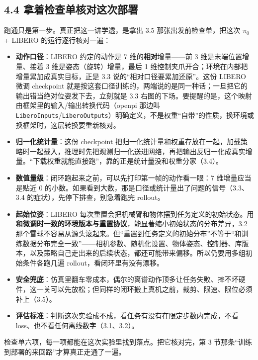 \documentclass[
  chinese,
]{ctexart}
\providecommand{\tightlist}{%
  \setlength{\itemsep}{0pt}\setlength{\parskip}{0pt}}
\begin{document}
\subsection{4.4
拿着检查单核对这次部署}\label{ux62ffux7740ux68c0ux67e5ux5355ux6838ux5bf9ux8fd9ux6b21ux90e8ux7f72}

跑通只是第一步。真正把这一讲学透，是拿出 3.5 那张出发前检查单，把这次
\(\pi_0\) + LIBERO 的运行逐行核对一遍：

\begin{itemize}
\tightlist
\item
  \textbf{动作口径}：LIBERO 约定的动作是 7 维的\textbf{相对}增量------前
  3 维是末端位置增量、接着 3 维是姿态（旋转）增量，最后 1
  维控制夹爪开合；环境在内部把增量累加成真实目标，正是 3.3
  说的``相对口径要累加还原''。这份 LIBERO 微调 checkpoint
  就是按这套口径训练的，两端说的是同一种话；一旦把它的输出错当绝对位姿发下去，立刻就是
  3.3
  右图的下场。要提醒的是，这个映射由框架里的输入/输出转换代码（openpi
  那边叫
  \texttt{LiberoInputs}/\texttt{LiberoOutputs}）明确定义，不是权重``自带''的性质，换环境或换框架时，这层转换要重新核对。
\item
  \textbf{归一化统计量}：这份 checkpoint
  把归一化统计量和权重存放在一起，加载策略时一起载入，推理时先把观测归一化送进网络，再把输出反归一化成真实增量。``下载权重就能直接跑''，靠的正是统计量没和权重分家（3.4）。
\item
  \textbf{数值量级}：闭环跑起来之前，可以先打印第一帧的动作看一眼：7
  维增量应当是贴近 0
  的小数。如果看到大数，那是口径或统计量出了问题的信号（3.3、3.4
  的症状），先停下排查，别急着跑完 rollout。
\item
  \textbf{起始位姿}：LIBERO
  每次重置会把机械臂和物体摆到任务定义的初始状态。用\textbf{和微调时一致的环境版本与重置协议}，能显著缩小初始状态的分布差异，3.2
  那个雪球不容易从源头滚起来。但``重置到任务定义的初始分布''不等于``和训练数据分布完全一致''------相机参数、随机化设置、物体姿态、控制器、库版本，以及策略自己走出来的后续状态，都还可能带来偏移。所以仍要用多组初始条件各跑几遍
  rollout，看闭环里有没有漂移。
\item
  \textbf{安全兜底}：仿真里翻车零成本，偶尔的离谱动作顶多让任务失败、摔不坏硬件，这一关可以先放松；但同样的闭环搬上真机之前，裁剪、限速、限位必须补上（3.5）。
\item
  \textbf{评估标准}：判断这次实验成不成，看任务有没有在限定步数内完成，不看
  loss、也不看任何离线数字（3.1、3.2）。
\end{itemize}

检查单六项，每一项都能在这次实验里找到落点。把它核对完，第 3
节那条``训练到部署的来回路''才算真正走通了一遍。
\end{document}
